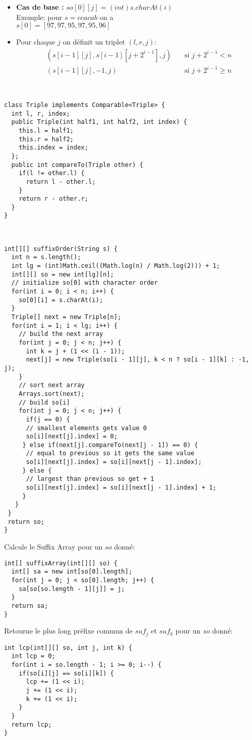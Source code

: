 \begin{itemize}

\item\textbf{Cas de base : }$so[0][j] = (int)s.charAt(i) $\\
Exemple: pour $s = ccacab$ on a \\$ s[0] = [97, 97, 95, 97, 95, 96]$
\item Pour chaque $j$ on définit un triplet $(l, r, j)$:
\begin{align*}
(s[i - 1][j], s[i - 1][j + 2^{i - 1}], j) & \quad \text{si $j + 2^{i - 1} < n$} \\
(s[i - 1][j], -1, j) & \quad \text{si $j + 2^{i - 1} \geq n$}
\end{align*}

\end{itemize}
\ \newline
\begin{lstlisting}
class Triple implements Comparable<Triple> {
  int l, r, index;
  public Triple(int half1, int half2, int index) {
    this.l = half1;
    this.r = half2;
    this.index = index;
  };
  public int compareTo(Triple other) {
    if(l != other.l) {
      return l - other.l;
    }
    return r - other.r;
  }
} 
\end{lstlisting}
\ \newline
\begin{lstlisting}
int[][] suffixOrder(String s) {
  int n = s.length();
  int lg = (int)Math.ceil((Math.log(n) / Math.log(2))) + 1;
  int[][] so = new int[lg][n];
  // initialize so[0] with character order
  for(int i = 0; i < n; i++) {
    so[0][i] = s.charAt(i);
  }
  Triple[] next = new Triple[n];
  for(int i = 1; i < lg; i++) {
    // build the next array
    for(int j = 0; j < n; j++) {
      int k = j + (1 << (i - 1));
      next[j] = new Triple(so[i - 1][j], k < n ? so[i - 1][k] : -1, j);
    }
    // sort next array
    Arrays.sort(next);
    // build so[i]
    for(int j = 0; j < n; j++) {
      if(j == 0) {
      // smallest elements gets value 0 
      so[i][next[j].index] = 0;
     } else if(next[j].compareTo(next[j - 1]) == 0) {
      // equal to previous so it gets the same value
      so[i][next[j].index] = so[i][next[j - 1].index];
     } else {
      // largest than previous so get + 1
      so[i][next[j].index] = so[i][next[j - 1].index] + 1;
     }
   }
 }
 return so;
}
\end{lstlisting}

Calcule le Suffix Array pour un $so$ donné:\ \newline
\begin{lstlisting}
int[] suffixArray(int[][] so) {
  int[] sa = new int[so[0].length];
  for(int j = 0; j < so[0].length; j++) {
    sa[so[so.length - 1][j]] = j;
  }
  return sa;
}
\end{lstlisting}

Retourne le plus long préfixe commun de $suf_j$ et $suf_k$ pour un $so$ donné:\ \newline
\begin{lstlisting}
int lcp(int[][] so, int j, int k) {
  int lcp = 0;
  for(int i = so.length - 1; i >= 0; i--) {
    if(so[i][j] == so[i][k]) {
      lcp += (1 << i);
      j += (1 << i);
      k += (1 << i);
    }
  }
  return lcp;
}
\end{lstlisting}